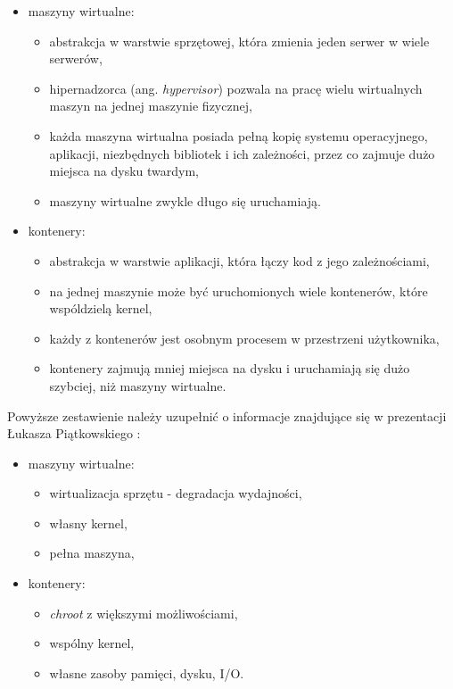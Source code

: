 \begin{itemize}
  \item maszyny wirtualne:
  \begin{itemize}
    \item abstrakcja w warstwie sprzętowej, która zmienia jeden serwer w wiele serwerów,
    \item hipernadzorca (ang. \textit{hypervisor}) pozwala na pracę wielu wirtualnych maszyn na jednej maszynie fizycznej,
    \item każda maszyna wirtualna posiada pełną kopię systemu operacyjnego, aplikacji, niezbędnych bibliotek i ich zależności, przez co zajmuje dużo miejsca na dysku twardym,
    \item maszyny wirtualne zwykle długo się uruchamiają.
  \end{itemize}

  \item kontenery:
  \begin{itemize}
    \item abstrakcja w warstwie aplikacji, która łączy kod z jego zależnościami,
    \item na jednej maszynie może być uruchomionych wiele kontenerów, które wspóldzielą kernel,
    \item każdy z kontenerów jest osobnym procesem w przestrzeni użytkownika,
    \item kontenery zajmują mniej miejsca na dysku i uruchamiają się dużo szybciej, niż maszyny wirtualne.
  \end{itemize}
\end{itemize}

Powyższe zestawienie należy uzupełnić o informacje znajdujące się w prezentacji Łukasza Piątkowskiego \cite{docker_prez}:
\begin{itemize}
  \item maszyny wirtualne:
  \begin{itemize}
    \item wirtualizacja sprzętu - degradacja wydajności,
    \item własny kernel,
    \item pełna maszyna,
  \end{itemize}

  \item kontenery:
  \begin{itemize}
    \item \textit{chroot} z większymi możliwościami,
    \item wspólny kernel,
    \item własne zasoby pamięci, dysku, I/O.
  \end{itemize}
\end{itemize}

